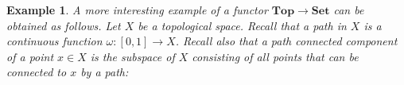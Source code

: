\documentclass[11pt, letterpaper, oneside]{report}
\theoremstyle{pplain}
\theoremstyle{ddefinition}
\newtheorem{example}[theorem]{Example}
\theoremstyle{nnn}
\theoremstyle{eexercise}
\newcommand{\Top}{{\mathbf{Top}}}
\newcommand{\Set}{{\mathbf{Set}}}
\begin{document}
\begin{example}
\label{PI ZERO FUNCTOR EXAMPLE}
A more interesting example of a functor $\Top \to \Set$ can be obtained as follows. 
Let $X$ be a topological space. Recall that a \emph{path} in $X$ is a continuous 
function $\omega\colon [0, 1]\to X$. Recall also that a \emph{path connected component}
of a point $x\in X$ is the subspace of $X$ consisting of all points that can be 
connected to $x$ by a path:

 

\end{example}
\end{document}
